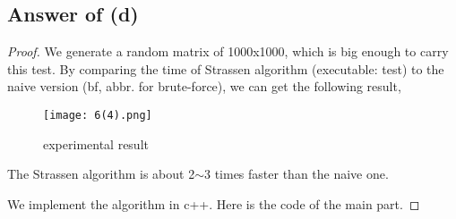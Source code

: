 \documentclass[letterpaper,11pt\iffalse ,draft\fi]{article}
\begin{document}
\subsection*{Answer of (d)}
\begin{proof}

We generate a random matrix of 1000x1000, which is big enough to carry this test. By comparing the time of Strassen algorithm (executable: test) to the naive version (bf, abbr. for brute-force), we can get the following result,

\begin{figure}[htb] \centering 
    \texttt{[image: 6(4).png]}
    \caption{experimental result}
    \end{figure}

The Strassen algorithm is about 2$\sim$3 times faster than the naive one.

We implement the algorithm in c++. Here is the code of the main part.


\end{proof}
\end{document}
